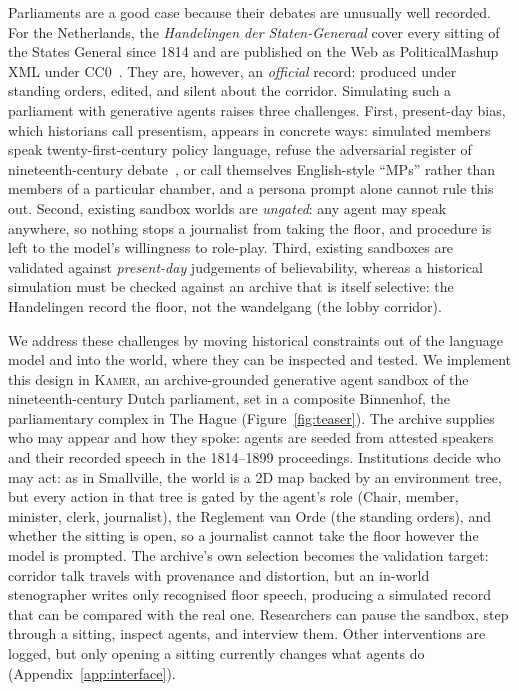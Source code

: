 \documentclass[sigconf,review,anonymous]{acmart}
\newcommand{\sys}{\textsc{Kamer}}
\begin{document}
Parliaments are a good case because their debates are unusually well
recorded. For the Netherlands, the \emph{Handelingen der Staten-Generaal}
cover every sitting of the States General since 1814 and are published on
the Web as PoliticalMashup XML under
CC0~\cite{marx2012dutchparl,marx2010dutchparl}. They are, however, an
\emph{official} record: produced under standing orders, edited, and silent
about the corridor. Simulating such a parliament with generative agents
raises three challenges. First, present-day bias, which historians call
presentism, appears in concrete ways: simulated members speak
twenty-first-century policy language, refuse the adversarial register of
nineteenth-century debate~\cite{wang2025identity,bender2021parrots}, or
call themselves English-style ``MPs'' rather than members of a particular
chamber, and a persona prompt alone cannot rule this out.
Second, existing sandbox worlds are \emph{ungated}: any agent may speak
anywhere, so nothing stops a journalist from taking the floor, and
procedure is left to the model's willingness to role-play. Third, existing
sandboxes are validated against \emph{present-day} judgements of
believability, whereas a historical simulation must be checked against an
archive that is itself selective: the Handelingen record the floor, not
the wandelgang (the lobby corridor).

We address these challenges by moving historical constraints out of the
language model and into the world, where they can be inspected and
tested. We implement this design in \sys{}, an archive-grounded generative
agent sandbox of the nineteenth-century Dutch parliament, set in a
composite Binnenhof, the parliamentary complex in The Hague
(Figure~\ref{fig:teaser}). The archive supplies who may appear and how
they spoke: agents are seeded from attested speakers and their recorded
speech in the 1814--1899 proceedings. Institutions decide who may act: as
in Smallville, the world is a 2D map backed by an environment tree, but
every action in that tree is gated by the agent's role (Chair, member,
minister, clerk, journalist), the Reglement van Orde (the standing
orders), and whether the sitting is open, so a journalist cannot take the
floor however the model is prompted. The archive's own selection becomes
the validation target: corridor talk travels with provenance and
distortion, but an in-world stenographer writes only recognised floor
speech, producing a simulated record that can be compared with the real
one. Researchers can pause the sandbox, step through a sitting, inspect
agents, and interview them. Other interventions are logged, but only
opening a sitting currently changes what agents do
(Appendix~\ref{app:interface}).
\end{document}
